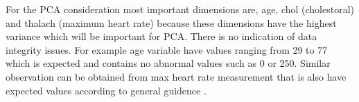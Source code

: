 \documentclass[12pt]{article}
\begin{document}
For the PCA consideration most important dimensions are, age, chol (cholestoral) and thalach (maximum heart rate) because these dimensions have the highest variance which will be important for PCA. There is no indication of data integrity issues. For example age variable have values ranging from 29 to 77 which is expected and contains no abnormal values such as 0 or 250. Similar observation can be obtained from max heart rate measurement that is also have expected values according to general guidence \cite{maya}.

\printbibliography
\end{document}
